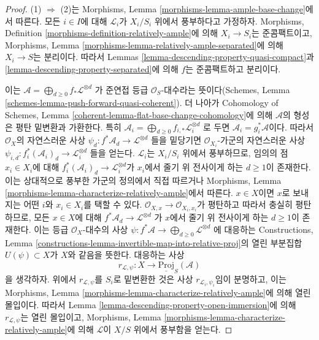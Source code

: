 \begin{proof}
(1) $\Rightarrow$ (2)는 Morphisms, Lemma
\ref{morphisms-lemma-ample-base-change}에서 따른다. 모든 $i \in I$에
대해 $\mathcal{L}_i$가 $X_i/S_i$ 위에서 풍부하다고 가정하자. Morphisms,
Definition \ref{morphisms-definition-relatively-ample}에 의해
$X_i \to S_i$는 준콤팩트이고, Morphisms, Lemma
\ref{morphisms-lemma-relatively-ample-separated}에 의해
$X_i \to S$는 분리이다. 따라서 Lemmas
\ref{lemma-descending-property-quasi-compact}과
\ref{lemma-descending-property-separated}에 의해 $f$는 준콤팩트하고
분리이다.

\medskip\noindent
이는
$\mathcal{A} = \bigoplus_{d \geq 0} f_*\mathcal{L}^{\otimes d}$
가 준연접 등급 $\mathcal{O}_S$-대수라는 뜻이다(Schemes, Lemma
\ref{schemes-lemma-push-forward-quasi-coherent}). 더 나아가 Cohomology
of Schemes, Lemma \ref{coherent-lemma-flat-base-change-cohomology}에
의해 $\mathcal{A}$의 형성은 평탄 밑변환과 가환한다. 특히
$\mathcal{A}_i = \bigoplus_{d \geq 0} f_{i, *}\mathcal{L}_i^{\otimes d}$
로 두면 $\mathcal{A}_i = g_i^*\mathcal{A}$이다. 따라서
$\mathcal{O}_X$의 자연스러운 사상
$\psi_d : f^*\mathcal{A}_d \to \mathcal{L}^{\otimes d}$
들을 밑당기면 $\mathcal{O}_{X_i}$-가군의 자연스러운 사상
$\psi_{i, d} : f_i^*(\mathcal{A}_i)_d \to \mathcal{L}_i^{\otimes d}$
들을 얻는다. $\mathcal{L}_i$는 $X_i/S_i$ 위에서 풍부하므로, 임의의 점
$x_i \in X_i$에 대해 $f_i^*(\mathcal{A}_i)_d \to
\mathcal{L}_i^{\otimes d}$가 $x_i$에서 줄기 위 전사이게 하는
$d \geq 1$이 존재한다. 이는 상대적으로 풍부한 가군의 정의에서 직접
따르거나 Morphisms, Lemma
\ref{morphisms-lemma-characterize-relatively-ample}에서 따른다.
$x \in X$이면 $x$로 보내지는 어떤 $i$와 $x_i \in X_i$를 택할 수 있다.
$\mathcal{O}_{X, x} \to \mathcal{O}_{X_i, x_i}$가 평탄하고 따라서
충실히 평탄하므로, 모든 $x \in X$에 대해
$f^*\mathcal{A}_d \to \mathcal{L}^{\otimes d}$
가 $x$에서 줄기 위 전사이게 하는 $d \geq 1$이 존재한다. 이는 등급
$\mathcal{O}_X$-대수의 사상
$\psi : f^*\mathcal{A} \to \bigoplus_{d \geq 0} \mathcal{L}^{\otimes d}$
에 대응하는 Constructions, Lemma
\ref{constructions-lemma-invertible-map-into-relative-proj}의 열린 부분집합
$U(\psi) \subset X$가 $X$와 같음을 뜻한다. 대응하는 사상
$$
r_{\mathcal{L}, \psi} : X \longrightarrow \underline{\text{Proj}}_S(\mathcal{A})
$$
을 생각하자. 위에서 $r_{\mathcal{L}, \psi}$를 $S_i$로 밑변환한 것은
사상 $r_{\mathcal{L}_i, \psi_i}$임이 분명하고, 이는 Morphisms, Lemma
\ref{morphisms-lemma-characterize-relatively-ample}에 의해 열린
몰입이다. 따라서 Lemma \ref{lemma-descending-property-open-immersion}에
의해 $r_{\mathcal{L}, \psi}$는 열린 몰입이고, Morphisms, Lemma
\ref{morphisms-lemma-characterize-relatively-ample}에 의해
$\mathcal{L}$이 $X/S$ 위에서 풍부함을 얻는다.
\end{proof}















